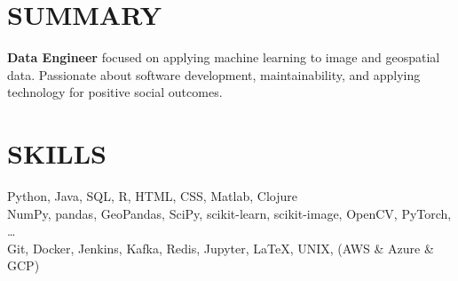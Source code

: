 \documentclass[margin,line]{resume}
\begin{document}
\begin{resume}


    \section{\mysidestyle \textbf{\large{S}\small{UMMARY}}}

    \textbf{Data Engineer} focused on applying machine learning to image and geospatial data. Passionate about software development, maintainability, and applying technology for positive social outcomes.

\sectionline
    \section{\mysidestyle \textbf{\large{S}\small{KILLS}}}

    Python, \hspace{2mm}Java, \hspace{2mm}SQL, \hspace{2mm}R, \hspace{2mm}HTML, \hspace{2mm}CSS, \hspace{2mm}Matlab, \hspace{2mm}Clojure \\
    NumPy, \hspace{2mm}pandas, \hspace{2mm}GeoPandas, \hspace{2mm}SciPy, \hspace{2mm}scikit-learn, \hspace{2mm}scikit-image, \hspace{2mm}OpenCV, \hspace{2mm}PyTorch, \ldots \\
    Git, \hspace{2mm}Docker, \hspace{2mm}Jenkins, \hspace{2mm}Kafka, \hspace{2mm}Redis, \hspace{2mm}Jupyter, \hspace{2mm}\LaTeX, \hspace{2mm}UNIX, \hspace{2mm}(AWS \& Azure \& GCP)


\end{resume}
\end{document}
